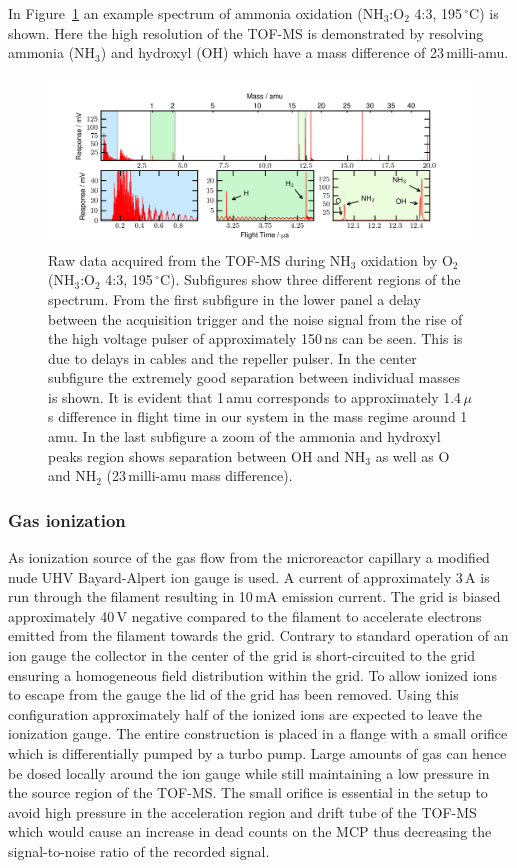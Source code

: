 \documentclass[aip,rsi]{revtex4-1}
\begin{document}
In Figure~\ref{fig:untreated_data} an example spectrum of ammonia oxidation (NH$_3$:O$_2$ 4:3, 195\,$^{\circ}$C) is shown. Here the high resolution of the TOF-MS is demonstrated by resolving ammonia (NH$_3$) and hydroxyl (OH) which have a mass difference of 23\,milli-amu.
\begin{figure}
 \includegraphics[width=17cm]{untreated_data.png}%
 \caption{Raw data acquired from the TOF-MS during NH$_3$ oxidation by O$_2$ (NH$_3$:O$_2$ 4:3, 195\,$^{\circ}$C). Subfigures show three different regions of the spectrum. From the first subfigure in the lower panel a delay between the acquisition trigger and the noise signal from the rise of the high voltage pulser of approximately 150\,ns can be seen. This is due to delays in cables and the repeller pulser. In the center subfigure the extremely good separation between individual masses is shown. It is evident that 1\,amu corresponds to approximately 1.4\,$\mu$s difference in flight time in our system in the mass regime around 1\,amu. In the last subfigure a zoom of the ammonia and hydroxyl peaks region shows separation between OH and NH$_3$ as well as O and NH$_2$  (23\,milli-amu mass difference).\label{fig:untreated_data}}%
\end{figure}

\subsubsection{Gas ionization}
As ionization source of the gas flow from the microreactor capillary a modified nude UHV Bayard-Alpert ion gauge is used. A current of approximately 3\,A is run through the filament resulting in 10\,mA emission current. The grid is biased approximately 40\,V negative compared to the filament to accelerate electrons emitted from the filament towards the grid. Contrary to standard operation of an ion gauge the collector in the center of the grid is short-circuited to the grid ensuring a homogeneous field distribution within the grid. To allow ionized ions to escape from the gauge the lid of the grid has been removed. Using this configuration approximately half of the ionized ions are expected to leave the ionization gauge\cite{Nottingham1955}. The entire construction is placed in a flange with a small orifice which is differentially pumped by a turbo pump. Large amounts of gas can hence be dosed locally around the ion gauge while still maintaining a low pressure in the source region of the TOF-MS. The small orifice is essential in the setup to avoid high pressure in the acceleration region and drift tube of the TOF-MS which would cause an increase in dead counts on the MCP thus decreasing the signal-to-noise ratio of the recorded signal.
\end{document}
